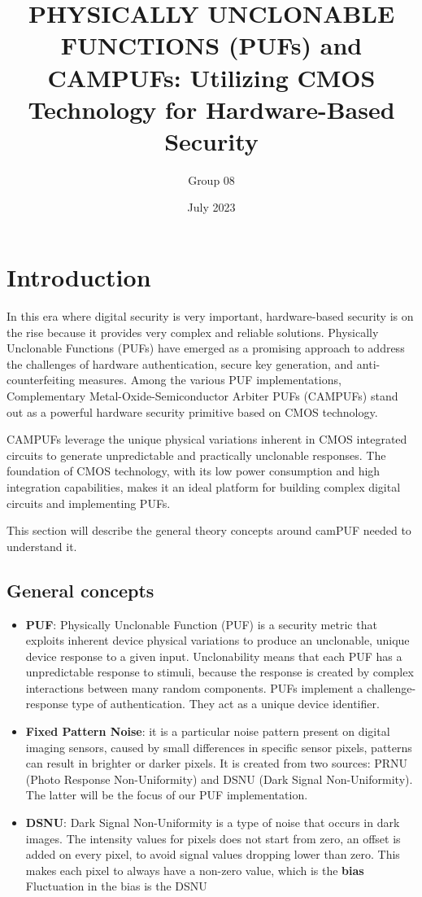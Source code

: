 \documentclass{article}
\title{\textbf{PHYSICALLY UNCLONABLE FUNCTIONS (PUFs) and CAMPUFs: Utilizing CMOS Technology for Hardware-Based Security}}
\author{ Group 08 } %
\date{July 2023}
\begin{document}
\maketitle
\section{Introduction}
In this era where digital security is very important, hardware-based security is on the rise because it provides very complex and reliable solutions.
Physically Unclonable Functions (PUFs) have emerged as a promising approach to address the challenges of hardware authentication, secure key generation,
and anti-counterfeiting measures. Among the various PUF implementations, Complementary Metal-Oxide-Semiconductor Arbiter PUFs (CAMPUFs) stand out as a powerful
hardware security primitive based on CMOS technology.

CAMPUFs leverage the unique physical variations inherent in CMOS integrated circuits to generate unpredictable and practically unclonable responses.
The foundation of CMOS technology, with its low power consumption and high integration capabilities, makes it an ideal platform for building complex 
digital circuits and implementing PUFs.

This section will describe the general theory concepts around camPUF needed to understand it.
\subsection{General concepts}
\begin{itemize}
\item \textbf{PUF}: Physically Unclonable Function (PUF) is a security metric that exploits inherent device physical variations to produce an unclonable, 
unique device response to a given input. Unclonability means that each PUF has a unpredictable response to stimuli, because the response is created by complex interactions between many random components.
PUFs implement a challenge-response type of authentication. They act as a unique device identifier.
\item \textbf{Fixed Pattern Noise}: it is a particular noise pattern present on digital imaging sensors, caused by small differences in specific sensor pixels, patterns can result in brighter or darker pixels.
    It is created from two sources: PRNU (Photo Response Non-Uniformity) and DSNU (Dark Signal Non-Uniformity). The latter will be the focus of our PUF implementation.
\item \textbf{DSNU}: Dark Signal Non-Uniformity is a type of noise that occurs in dark images. The intensity values for pixels does not start from zero, an offset is added on every pixel,
    to avoid signal values dropping lower than zero. This makes each pixel to always have a non-zero value, which is the \textbf{bias}
    Fluctuation in the bias is the DSNU

\end{itemize}
\end{document}
